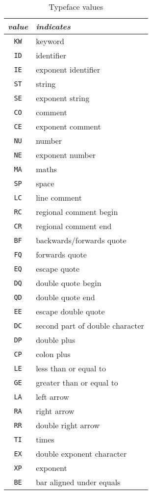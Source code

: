 \begin{table}
\begin{center}
\begin{tabular}{|c|l|} \hline
{\em value\/} & {\em indicates\/} \\ \hline
{\tt KW} & keyword \\
{\tt ID} & identifier \\
{\tt IE} & exponent identifier \\
{\tt ST} & string \\
{\tt SE} & exponent string \\
{\tt CO} & comment \\
{\tt CE} & exponent comment \\
{\tt NU} & number \\
{\tt NE} & exponent number \\
{\tt MA} & maths \\
{\tt SP} & space \\
{\tt LC} & line comment \\
{\tt RC} & regional comment begin \\
{\tt CR} & regional comment end \\
{\tt BF} & backwards/forwards quote \\
{\tt FQ} & forwards quote \\
{\tt EQ} & escape quote \\
{\tt DQ} & double quote begin \\
{\tt QD} & double quote end \\
{\tt EE} & escape double quote \\
{\tt DC} & second part of double character \\
{\tt DP} & double plus \\
{\tt CP} & colon plus \\
{\tt LE} & less than or equal to \\
{\tt GE} & greater than or equal to \\
{\tt LA} & left arrow \\
{\tt RA} & right arrow \\
{\tt RR} & double right arrow \\
{\tt TI} & times \\
{\tt EX} & double exponent character \\
{\tt XP} & exponent \\
{\tt BE} & bar aligned under equals \\ \hline
\end{tabular}
\end{center}
\caption{Typeface values} \label{tf-val}
\end{table}

